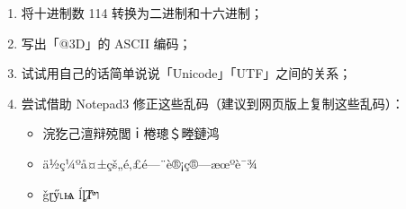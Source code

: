 \practice

\begin{enumerate}
  \item 将十进制数 114 转换为二进制和十六进制；
  \item 写出「@3D」的 ASCII 编码；
  \item 试试用自己的话简单说说「Unicode」「UTF」之间的关系；
  \item 尝试借助 Notepad3 修正这些乱码（建议到网页版上复制这些乱码）：
    \begin{itemize}
      \item 浣犵己澶辩殑閭ｉ棬璁＄畻鏈鸿
      \item ä½ç¼ºå¤±çš„é‚£é—¨è®¡ç®—æœºè¯¾
      \item \clearglue{}ǧɽӳ˪ѩ ĺȴȾͮ{\Hebrew{}ױ}\restoreglue
    \end{itemize}
\end{enumerate}
